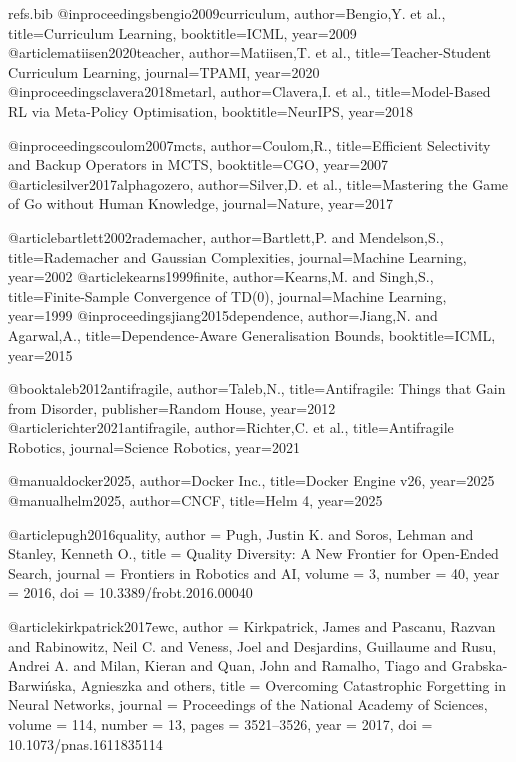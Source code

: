 \begin{filecontents*}[overwrite]{refs.bib}
@inproceedings{bengio2009curriculum, author={Bengio,Y. et al.},
  title={Curriculum Learning}, booktitle={ICML}, year={2009}}
@article{matiisen2020teacher, author={Matiisen,T. et al.},
  title={Teacher-Student Curriculum Learning}, journal={TPAMI}, year={2020}}
@inproceedings{clavera2018metarl, author={Clavera,I. et al.},
  title={Model-Based RL via Meta-Policy Optimisation}, booktitle={NeurIPS}, year={2018}}

@inproceedings{coulom2007mcts, author={Coulom,R.},
  title={Efficient Selectivity and Backup Operators in MCTS}, booktitle={CGO}, year={2007}}
@article{silver2017alphagozero, author={Silver,D. et al.},
  title={Mastering the Game of Go without Human Knowledge}, journal={Nature}, year={2017}}

@article{bartlett2002rademacher, author={Bartlett,P. and Mendelson,S.},
  title={Rademacher and Gaussian Complexities}, journal={Machine Learning}, year={2002}}
@article{kearns1999finite, author={Kearns,M. and Singh,S.},
  title={Finite-Sample Convergence of TD(0)}, journal={Machine Learning}, year={1999}}
@inproceedings{jiang2015dependence, author={Jiang,N. and Agarwal,A.},
  title={Dependence-Aware Generalisation Bounds}, booktitle={ICML}, year={2015}}

@book{taleb2012antifragile, author={Taleb,N.},
  title={Antifragile: Things that Gain from Disorder}, publisher={Random House}, year={2012}}
@article{richter2021antifragile, author={Richter,C. et al.},
  title={Antifragile Robotics}, journal={Science Robotics}, year={2021}}

@manual{docker2025, author={Docker Inc.}, title={Docker Engine v26}, year={2025}}
@manual{helm2025, author={CNCF}, title={Helm 4}, year={2025}}

@article{pugh2016quality,
  author  = {Pugh, Justin K. and Soros, Lehman and Stanley, Kenneth O.},
  title   = {Quality Diversity: A New Frontier for Open-Ended Search},
  journal = {Frontiers in Robotics and AI},
  volume  = {3},
  number  = {40},                  %
  year    = {2016},
  doi     = {10.3389/frobt.2016.00040}  %
}

@article{kirkpatrick2017ewc,
  author  = {Kirkpatrick, James and Pascanu, Razvan and Rabinowitz, Neil C.
            and Veness, Joel and Desjardins, Guillaume and Rusu, Andrei A.
            and Milan, Kieran and Quan, John and Ramalho, Tiago
            and Grabska-Barwińska, Agnieszka and others},
  title   = {Overcoming Catastrophic Forgetting in Neural Networks},
  journal = {Proceedings of the National Academy of Sciences},
  volume  = {114},
  number  = {13},
  pages   = {3521--3526},
  year    = {2017},
  doi     = {10.1073/pnas.1611835114}
}


\end{filecontents*}
